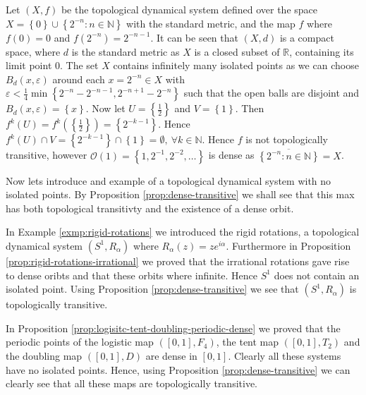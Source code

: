 \begin{exmp} \label{exmp:dense-orbit-not-equal-transitive}
    Let $(X, f)$ be the topological dynamical system defined over the space $X = \left\lbrace 0 \right\rbrace \cup \left\lbrace 2^{-n} : n \in \mathbb{N} \right\rbrace$ with the standard metric, and the map $f$ where $f(0) = 0$ and $f(2^{-n}) = 2^{-n-1}$. It can be seen that $(X, d)$ is a compact space, where $d$ is the standard metric as $X$ is a closed subset of $\mathbb{R}$, containing its limit point $0$. The set $X$ contains infinitely many isolated points as we can choose $B_d(x, \varepsilon)$ around each $x = 2^{-n} \in X$ with $\varepsilon < \frac{1}{4} \min\left\lbrace 2^{-n} - 2^{-n-1}, 2^{-n + 1} - 2^{-n} \right\rbrace$ such that the open balls are disjoint and $B_d(x, \varepsilon) = \left\lbrace x \right\rbrace$. Now let $U = \left\lbrace \frac{1}{2} \right\rbrace$ and $V = \left\lbrace 1 \right\rbrace$. Then $f^k(U) = f^k(\left\lbrace \frac{1}{2} \right\rbrace) = \left\lbrace 2^{-k-1} \right\rbrace$. Hence $f^k(U) \cap V = \left\lbrace 2^{-k-1} \right\rbrace \cap \left\lbrace 1 \right\rbrace = \emptyset, \ \forall k \in \mathbb{N}$. Hence $f$ is not topologically transitive, however $\mathcal{O}(1) = \left\lbrace 1, 2^{-1}, 2^{-2}, \dots \right\rbrace$ is dense as $\overline{\left\lbrace2^{-n}: n \in \mathbb{N}\right\rbrace} = X$.
\end{exmp}

Now lets introduce and example of a topological dynamical system with no isolated points. By Proposition \ref{prop:dense-transitive} we shall see that this max has both topological transitivty and the existence of a dense orbit.

\begin{exmp} \label{exmp:dense-orbit-and-transitive}
    In Example \ref{exmp:rigid-rotations} we introduced the rigid rotations, a topological dynamical system $(S^1, R_\alpha)$ where $R_{\alpha}(z) = ze^{i\alpha}$. Furthermore in Proposition \ref{prop:rigid-rotations-irrational} we proved that the irrational rotations gave rise to dense oribts and that these orbits where infinite. Hence $S^1$ does not contain an isolated point. Using Proposition \ref{prop:dense-transitive} we see that $(S^1, R_\alpha)$ is topologically transitive.
\end{exmp}

\begin{exmp} \label{exmp:logistic-tent-doubling-transitive}
    In Proposition \ref{prop:logisitc-tent-doubling-periodic-dense} we proved that the periodic points of the logistic map $([0, 1], F_4)$, the tent map $([0, 1], T_2)$ and the doubling map $([0, 1], D)$ are dense in $[0, 1]$. Clearly all these systems have no isolated points. Hence, using Proposition \ref{prop:dense-transitive} we can clearly see that all these maps are topologically transitive.
\end{exmp}

